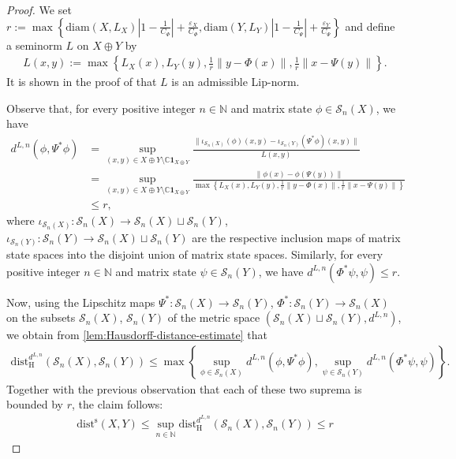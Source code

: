 \documentclass{amsart}
\theoremstyle{plain}
\theoremstyle{definition}
\theoremstyle{remark}
\begin{document}
	\begin{proof}
		We set $r := \max\left\{\mathrm{diam}(X,L_X) \left| 1-\frac{1}{C_\Phi}\right| + \frac{\varepsilon_X}{C_\Phi}, \mathrm{diam}(Y,L_Y) \left| 1-\frac{1}{C_\Psi}\right| + \frac{\varepsilon_Y}{C_\Psi}\right\}$ and define a seminorm $L$ on $X \oplus Y$ by 
		\begin{align}
			L(x,y) := \max \left\{ L_X(x), L_Y(y), \frac{1}{r} \lVert y - \Phi(x) \rVert, \frac{1}{r} \lVert x - \Psi(y)\rVert \right\}.
		\end{align}
		It is shown in the proof of \cite[Proposition 2.14]{KK22} that $L$ is an admissible Lip-norm.
		
		Observe that, for every positive integer $n \in \mathbb{N}$ and matrix state $\phi \in \mathcal{S}_n(X)$, we have
		\begin{align}
			d^{L,n}(\phi, \Psi^*\phi)
			&= \sup_{(x,y) \in X \oplus Y \setminus \mathbb{C}\mathbf{1}_{X \oplus Y}} \frac{\lVert\iota_{\mathcal{S}_n(X)}(\phi)(x,y) - \iota_{\mathcal{S}_n(Y)}(\Psi^*\phi)(x,y)\rVert}{L(x,y)} \\
			&= \sup_{(x,y) \in X \oplus Y \setminus \mathbb{C}\mathbf{1}_{X \oplus Y}} \frac{\lVert\phi(x) - \phi(\Psi(y))\rVert}{\max \left\{ L_X(x), L_Y(y), \frac{1}{r} \lVert y - \Phi(x)\rVert, \frac{1}{r} \lVert x - \Psi(y)\rVert \right\}} \\
			&\leq r,
		\end{align}
		where $\iota_{\mathcal{S}_n(X)} : \mathcal{S}_n(X) \rightarrow \mathcal{S}_n(X) \sqcup \mathcal{S}_n(Y)$, $\iota_{\mathcal{S}_n(Y)} : \mathcal{S}_n(Y) \rightarrow \mathcal{S}_n(X) \sqcup \mathcal{S}_n(Y)$ are the respective inclusion maps of matrix state spaces into the disjoint union of matrix state spaces.
		Similarly, for every positive integer $n \in \mathbb{N}$ and matrix state $\psi \in \mathcal{S}_n(Y)$, we have $d^{L,n}(\Phi^*\psi,\psi) \leq r$.
		
		Now, using the Lipschitz maps $\Psi^* : \mathcal{S}_n(X) \rightarrow \mathcal{S}_n(Y)$, $\Phi^* : \mathcal{S}_n(Y) \rightarrow \mathcal{S}_n(X)$ on the subsets $\mathcal{S}_n(X)$, $\mathcal{S}_n(Y)$ of the metric space $(\mathcal{S}_n(X) \sqcup \mathcal{S}_n(Y), d^{L,n})$, we obtain from \autoref{lem:Hausdorff-distance-estimate} that
		\begin{align}
			\mathrm{dist}_\mathrm{H}^{d^{L,n}}(\mathcal{S}_n(X),\mathcal{S}_n(Y))
			\leq \max \left\{ \sup_{\phi \in \mathcal{S}_n(X)} d^{L,n}(\phi, \Psi^*\phi), \sup_{\psi \in \mathcal{S}_n(Y)} d^{L,n}(\Phi^*\psi, \psi) \right\}.
		\end{align}
		Together with the previous observation that each of these two suprema is bounded by $r$, the claim follows:
		\begin{align}
			\mathrm{dist}^\mathrm{s}(X,Y)
			\leq \sup_{n \in \mathbb{N}} \mathrm{dist}_\mathrm{H}^{d^{L,n}}(\mathcal{S}_n(X),\mathcal{S}_n(Y))
			\leq r
		\end{align}
	\end{proof} 
	
\end{document}
